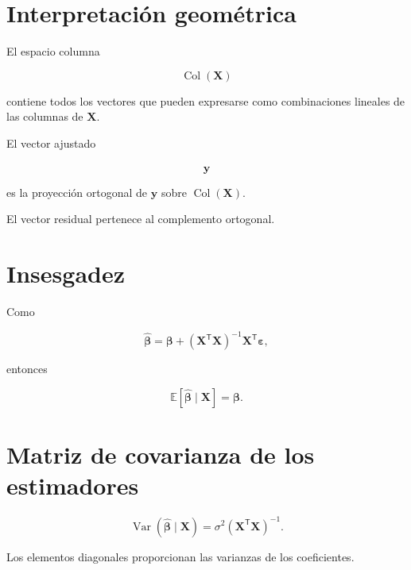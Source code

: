 \documentclass[
  spanish,
  10.5pt,
  letterpaper,
  DIV=11,
  numbers=noendperiod,
  oneside,
  open=any]{scrreprt}
\theoremstyle{definition}
\theoremstyle{definition}
\theoremstyle{plain}
\theoremstyle{remark}
\begin{document}
\section*{Interpretación
geométrica}\label{interpretaciuxf3n-geomuxe9trica-1}


El espacio columna

\[
\operatorname{Col}(\mathbf{X})
\]

contiene todos los vectores que pueden expresarse como combinaciones
lineales de las columnas de \(\mathbf{X}\).

El vector ajustado

\[
\widehat{\mathbf{y}}
\]

es la proyección ortogonal de \(\mathbf{y}\) sobre
\(\operatorname{Col}(\mathbf{X})\).

El vector residual pertenece al complemento ortogonal.

\section*{Insesgadez}\label{insesgadez}


Como

\[
\widehat{\boldsymbol{\beta}}
=
\boldsymbol{\beta}
+
\left(
\mathbf{X}^{\mathsf T}\mathbf{X}
\right)^{-1}
\mathbf{X}^{\mathsf T}\boldsymbol{\varepsilon},
\]

entonces

\[
\mathbb{E}
\left[
\widehat{\boldsymbol{\beta}}
\mid\mathbf{X}
\right]
=
\boldsymbol{\beta}.
\]

\section*{Matriz de covarianza de los
estimadores}\label{matriz-de-covarianza-de-los-estimadores}


\[
\operatorname{Var}
\left(
\widehat{\boldsymbol{\beta}}
\mid\mathbf{X}
\right)
=
\sigma^2
\left(
\mathbf{X}^{\mathsf T}\mathbf{X}
\right)^{-1}.
\]

Los elementos diagonales proporcionan las varianzas de los coeficientes.
\end{document}
